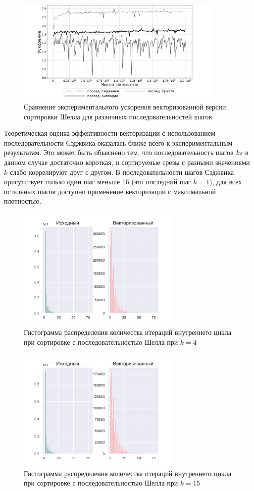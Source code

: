 \documentclass[utf8]{psta}
\begin{document}
\begin{figure}
\includegraphics[width=10cm]{pics/experimental_eff}
\caption{Сравнение экспериментального ускорения векторизованной версии сортировки Шелла для различных последовательностей шагов}
\label{pic:acc_exp}
\end{figure}

Теоретическая оценка эффективности векторизации с использованием  последовательности Сэджвика оказалась ближе всего к экспериментальным результатам. Это может быть объяснено тем, что последовательность шагов $ks$ в данном случае достаточно короткая, и сортируемые срезы с разными значениями $k$ слабо коррелируют друг с другом.
В последовательности шагов Сэджвика присутствует только один шаг меньше 16 (это последний шаг $k = 1$), для всех остальных шагов доступно применение векторизации с максимальной плотностью.

\begin{figure}
\includegraphics[width=8cm,height=6cm]{pics/pic_shell_k_4}
\caption{Гистограмма распределения количества итераций внутреннего цикла при сортировке с последовательностью Шелла при $k = 4$}
\label{pic:shell_k_4}
\end{figure}

\begin{figure}
\includegraphics[width=8cm,height=6cm]{pics/pic_shell_k_15}
\caption{Гистограмма распределения количества итераций внутреннего цикла при сортировке с последовательностью Шелла при $k = 15$}
\label{pic:shell_k_15}
\end{figure}
\end{document}

